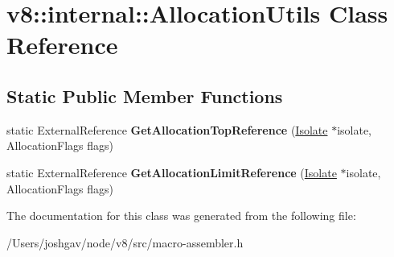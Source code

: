 \hypertarget{classv8_1_1internal_1_1_allocation_utils}{}\section{v8\+:\+:internal\+:\+:Allocation\+Utils Class Reference}
\label{classv8_1_1internal_1_1_allocation_utils}
\subsection*{Static Public Member Functions}
\begin{DoxyCompactItemize}
\item 
static External\+Reference {\bfseries Get\+Allocation\+Top\+Reference} (\hyperlink{classv8_1_1internal_1_1_isolate}{Isolate} $\ast$isolate, Allocation\+Flags flags)\hypertarget{classv8_1_1internal_1_1_allocation_utils_a5aea70b8a44c214a3638c585c4a342d1}{}\label{classv8_1_1internal_1_1_allocation_utils_a5aea70b8a44c214a3638c585c4a342d1}

\item 
static External\+Reference {\bfseries Get\+Allocation\+Limit\+Reference} (\hyperlink{classv8_1_1internal_1_1_isolate}{Isolate} $\ast$isolate, Allocation\+Flags flags)\hypertarget{classv8_1_1internal_1_1_allocation_utils_a6a4322d4278ca1f666fdcee2c9eecfca}{}\label{classv8_1_1internal_1_1_allocation_utils_a6a4322d4278ca1f666fdcee2c9eecfca}

\end{DoxyCompactItemize}


The documentation for this class was generated from the following file\+:\begin{DoxyCompactItemize}
\item 
/\+Users/joshgav/node/v8/src/macro-\/assembler.\+h\end{DoxyCompactItemize}
